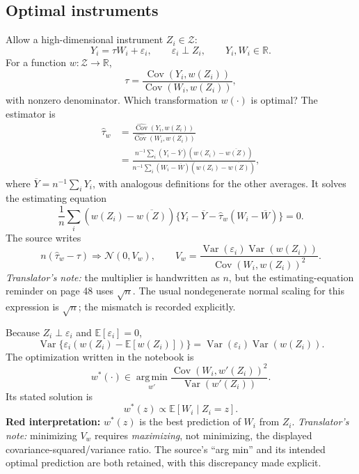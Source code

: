 \subsection{Optimal instruments}
Allow a high-dimensional instrument $Z_i\in\mathcal Z$:
\[
 Y_i=\tau W_i+\varepsilon_i,\qquad\varepsilon_i\perp Z_i,
 \qquad Y_i,W_i\in\mathbb R.
\]
For a function $w:\mathcal Z\to\mathbb R$,
\[
 \tau=\frac{\operatorname{Cov}(Y_i,w(Z_i))}
 {\operatorname{Cov}(W_i,w(Z_i))},\tag{9.8}
\]
with nonzero denominator. Which transformation $w(\cdot)$ is optimal? The estimator is
\begin{align*}
 \widehat\tau_w
 &=\frac{\widehat{\operatorname{Cov}}(Y_i,w(Z_i))}
 {\widehat{\operatorname{Cov}}(W_i,w(Z_i))}\\
 &=\frac{n^{-1}\sum_i(Y_i-\overline Y)(w(Z_i)-\overline{w(Z)})}
 {n^{-1}\sum_i(W_i-\overline W)(w(Z_i)-\overline{w(Z)})},\tag{9.9}
\end{align*}
where $\overline Y=n^{-1}\sum_iY_i$, with analogous definitions for the other averages. It solves the estimating equation
\[
 \frac1n\sum_i(w(Z_i)-\overline{w(Z)})
 \{Y_i-\overline Y-\widehat\tau_w(W_i-\overline W)\}=0.\tag{9.10}
\]
The source writes
\[
 n(\widehat\tau_w-\tau)\Rightarrow\mathcal N(0,V_w),
 \qquad
 V_w=\frac{\operatorname{Var}(\varepsilon_i)\operatorname{Var}(w(Z_i))}
 {\operatorname{Cov}(W_i,w(Z_i))^2}.\tag{9.11, source scaling}
\]
\textit{Translator's note:} the multiplier is handwritten as $n$, but the estimating-equation reminder on page 48 uses $\sqrt n$. The usual nondegenerate normal scaling for this expression is $\sqrt n$; the mismatch is recorded explicitly.

Because $Z_i\perp\varepsilon_i$ and $\mathbb E[\varepsilon_i]=0$,
\[
 \operatorname{Var}\{\varepsilon_i(w(Z_i)-\mathbb E[w(Z_i)])\}
 =\operatorname{Var}(\varepsilon_i)\operatorname{Var}(w(Z_i)).
\]
The optimization written in the notebook is
\[
 w^*(\cdot)\in\operatorname*{arg\,min}_{w'}
 \frac{\operatorname{Cov}(W_i,w'(Z_i))^2}{\operatorname{Var}(w'(Z_i))}.
\]
Its stated solution is
\[
 w^*(z)\propto\mathbb E[W_i\mid Z_i=z].
\]
\textbf{Red interpretation:} $w^*(z)$ is the best prediction of $W_i$ from $Z_i$.
\textit{Translator's note:} minimizing $V_w$ requires \emph{maximizing}, not minimizing, the displayed covariance-squared/variance ratio. The source's ``arg min'' and its intended optimal prediction are both retained, with this discrepancy made explicit.

